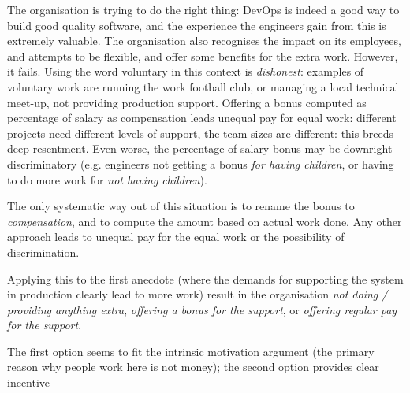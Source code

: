 The organisation is trying to do the right thing: DevOps is indeed a good way to build good quality software, and the experience the engineers gain from this is extremely valuable. The organisation also recognises the impact on its employees, and attempts to be flexible, and offer some benefits for the extra work. However, it fails. Using the word voluntary in this context is \emph{dishonest}: examples of voluntary work are running the work football club, or managing a local technical meet-up, not providing production support. Offering a bonus computed as percentage of salary as compensation leads unequal pay for equal work: different projects need different levels of support, the team sizes are different: this breeds deep resentment. Even worse, the percentage-of-salary bonus may be downright discriminatory (e.g. engineers not getting a bonus \emph{for having children}, or having to do more work for \emph{not having children}).

The only systematic way out of this situation is to rename the bonus to \emph{compensation}, and to compute the amount based on actual work done. Any other approach leads to unequal pay for the equal work or the possibility of discrimination.

Applying this to the first anecdote (where the demands for supporting the system in production clearly lead to more work) result in the organisation \emph{not doing / providing anything extra}, \emph{offering a bonus for the support}, or \emph{offering regular pay for the support}. 

The first option seems to fit the intrinsic motivation argument (the primary reason why people work here is not money); the second option provides clear incentive

\printbibliography

 